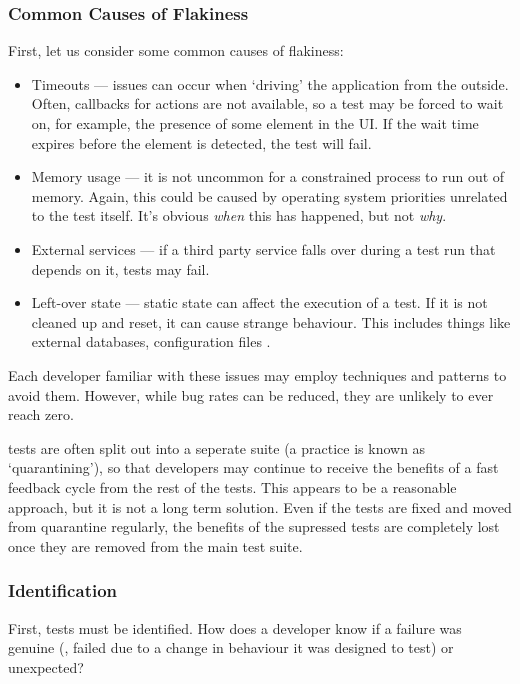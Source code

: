 \subsubsection{Common Causes of Flakiness}

First, let us consider some common causes of flakiness:
\begin{itemize}
	\item Timeouts --- issues can occur when {\lq}driving{\rq} the application
	from the outside. Often, callbacks for actions are not available, so a test
	may be forced to wait on, for example, the presence of some element in the UI.
	If the wait time expires before the element is detected, the test will fail.
	\item Memory usage --- it is not uncommon for a constrained process to run out
	of memory. Again, this could be caused by operating system priorities
	unrelated to the test itself. It's obvious \textit{when} this has happened,
	but not \textit{why}.
	\item External services --- if a third party service falls over during a test
	run that depends on it, tests may fail.
	\item Left-over state --- static state can affect the execution of a test. If
	it is not cleaned up and reset, it can cause strange behaviour. This includes
	things like external databases, configuration files \etc.
\end{itemize}

Each developer familiar with these issues may employ techniques and patterns to
avoid them. However, while bug rates can be reduced, they are unlikely to ever
reach zero.

\Flaky tests are often split out into a seperate suite (a practice is known as
{\lq}quarantining{\rq}), so that developers may continue to receive the benefits
of a fast feedback cycle from the rest of the tests. This appears to be a
reasonable approach, but it is not a long term solution. Even if the tests are
fixed and moved from quarantine regularly, the benefits of the supressed tests
are completely lost once they are removed from the main test suite.

\subsubsection{Identification}

First, \flaky tests must be identified. How does a developer know if a failure
was genuine (\ie, failed due to a change in behaviour it was designed to test)
or unexpected?

